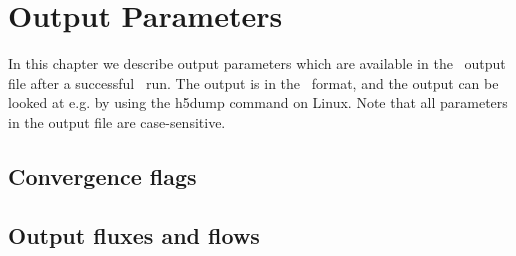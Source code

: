 \chapter{Output Parameters}
\label{ch:output}

In this chapter we describe output parameters which are available in the \sfincs~output file  after a successful \sfincs~run. 
The output is in the \HDF~format, and the output can be looked at e.g. by using the {\ttfamily h5dump} command on Linux. 
Note that all parameters in the output file are case-sensitive. 


\section{Convergence flags}

\section{Output fluxes and flows}

%
%
%

